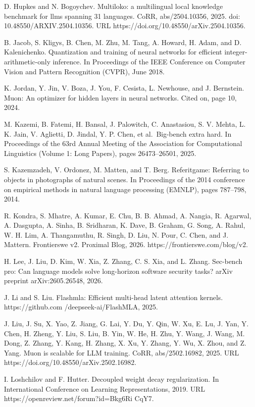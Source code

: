\documentclass[
  10
]{article}
\begin{document}
D. Hupkes and N. Bogoychev. Multiloko: a multilingual local knowledge
benchmark for llms spanning 31 languages. CoRR, abs/2504.10356, 2025.
doi: 10.48550/ARXIV.2504.10356. URL
https://doi.org/10.48550/arXiv.2504.10356.

B. Jacob, S. Kligys, B. Chen, M. Zhu, M. Tang, A. Howard, H. Adam, and
D. Kalenichenko. Quantization and training of neural networks for
efficient integer-arithmetic-only inference. In Proceedings of the IEEE
Conference on Computer Vision and Pattern Recognition (CVPR), June 2018.

K. Jordan, Y. Jin, V. Boza, J. You, F. Cesista, L. Newhouse, and J.
Bernstein. Muon: An optimizer for hidden layers in neural networks.
Cited on, page 10, 2024.

M. Kazemi, B. Fatemi, H. Bansal, J. Palowitch, C. Anastasiou, S. V.
Mehta, L. K. Jain, V. Aglietti, D. Jindal, Y. P. Chen, et al.~Big-bench
extra hard. In Proceedings of the 63rd Annual Meeting of the Association
for Computational Linguistics (Volume 1: Long Papers), pages
26473--26501, 2025.

S. Kazemzadeh, V. Ordonez, M. Matten, and T. Berg. Referitgame:
Referring to objects in photographs of natural scenes. In Proceedings of
the 2014 conference on empirical methods in natural language processing
(EMNLP), pages 787--798, 2014.

R. Kondra, S. Mhatre, A. Kumar, E. Chu, B. B. Ahmad, A. Nangia, R.
Agarwal, A. Dasgupta, A. Sinha, B. Sridharan, K. Dave, B. Graham, G.
Song, A. Rahul, W. H. Lim, A. Thangamuthu, R. Singh, D. Liu, N. Pour, C.
Chen, and J. Mattern. Frontierswe v2. Proximal Blog, 2026.
https://frontierswe.com/blog/v2.

H. Lee, J. Liu, D. Kim, W. Xia, Z. Zhang, C. S. Xia, and L. Zhang.
Sec-bench pro: Can language models solve long-horizon software security
tasks? arXiv preprint arXiv:2605.26548, 2026.

J. Li and S. Liu. Flashmla: Efficient multi-head latent attention
kernels. https://github.com /deepseek-ai/FlashMLA, 2025.

J. Liu, J. Su, X. Yao, Z. Jiang, G. Lai, Y. Du, Y. Qin, W. Xu, E. Lu, J.
Yan, Y. Chen, H. Zheng, Y. Liu, S. Liu, B. Yin, W. He, H. Zhu, Y. Wang,
J. Wang, M. Dong, Z. Zhang, Y. Kang, H. Zhang, X. Xu, Y. Zhang, Y. Wu,
X. Zhou, and Z. Yang. Muon is scalable for LLM training. CoRR,
abs/2502.16982, 2025. URL https://doi.org/10.48550/arXiv.2502.16982.

I. Loshchilov and F. Hutter. Decoupled weight decay regularization. In
International Conference on Learning Representations, 2019. URL
https://openreview.net/forum?id=Bkg6Ri CqY7.
\end{document}
